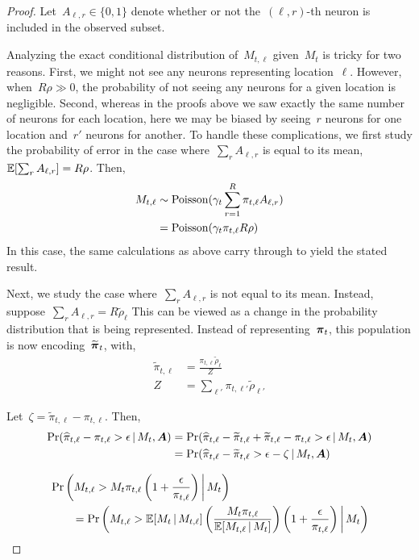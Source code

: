 \begin{proof}
  Let~$A_{\ell,r} \in \{0,1\}$ denote whether or not the~$(\ell,r)$-th neuron 
  is included in the observed subset.
  
  Analyzing the exact conditional distribution of~$M_{t, \ell}$
  given~$M_t$ is tricky for two reasons. First, we might not see any
  neurons representing location~$\ell$.  However, when~$R\rho \gg 0$,
  the probability of not seeing any neurons for a given location is
  negligible. Second, whereas in the proofs above we saw exactly the
  same number of neurons for each location, here we may be biased by
  seeing~$r$ neurons for one location and~$r'$ neurons for another. To
  handle these complications, we first study the probability of error
  in the case where~$\sum_{r} A_{\ell, r}$ is equal to its mean,
  $\mathbb{E}[\sum_{r} A_{\ell, r}] = R\rho$. Then,
  \begin{align}
    M_{t, \ell} &\sim \mathrm{Poisson}(\gamma_t \sum_{r=1}^R \pi_{t, \ell} A_{\ell, r}) \\
    &= \mathrm{Poisson}(  \gamma_t \pi_{t, \ell} R \rho)
  \end{align}
  In this case, the same calculations as above carry through to yield
  the stated result. 

  \sloppy
  Next, we study the case where~$\sum_{r} A_{\ell,r}$ is not equal to
  its mean. Instead, suppose~${\sum_{r} A_{\ell, r}=R \widetilde{\rho}_\ell}$
  This can be viewed as a change in
  the probability distribution that is being represented. Instead of
  representing~$\boldsymbol{\pi}_t$, this population is now encoding~$\widetilde{\boldsymbol{\pi}}_t$,
  with,
  \begin{align}
    \widetilde{\pi}_{t, \ell} &= \frac{\pi_{t, \ell} \widetilde{\rho}_\ell}{Z}\\
    Z &= \sum_{\ell'} \pi_{t, \ell'} \widetilde{\rho}_{\ell'}
  \end{align}

  Let~$\zeta = \widetilde{\pi}_{t, \ell} - \pi_{t, \ell}$. Then,
  \begin{align}
    \Pr(\widehat{\pi}_{t,\ell} - \pi_{t, \ell} > \epsilon \,|\, M_t, \boldsymbol{A}) &=
    \Pr(\widehat{\pi}_{t, \ell} - \widetilde{\pi}_{t, \ell} +
    \widetilde{\pi}_{t, \ell} - \pi_{t, \ell} > \epsilon \,|\, M_t, \boldsymbol{A}) \\
    &= \Pr(\widehat{\pi}_{t, \ell} - \widetilde{\pi}_{t, \ell} > \epsilon - \zeta \,|\, M_t, \boldsymbol{A})
  \end{align}
      
  \begin{align}
    &\Pr \left(M_{t, \ell} >
    M_{t} \pi_{t, \ell}
    \left(1 + \frac{\epsilon}{\pi_{t, \ell}} \right) \bigg| \, M_t \right)
    \\
    &\qquad= \Pr \left(M_{t, \ell} >
    \mathbb{E}[M_t \,|\, M_{t, \ell}] 
    \left(\frac{M_{t} \pi_{t, \ell}}{\mathbb{E}[M_{t, \ell} \,|\, M_{t}]} \right)
    \left(1 + \frac{\epsilon}{\pi_{t, \ell}} \right) \bigg| \,M_t \right)
  \end{align}


\end{proof}
